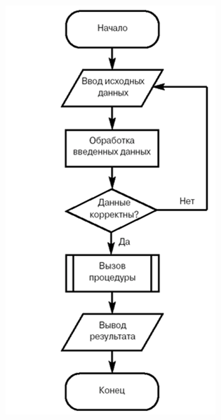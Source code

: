 \documentclass[default]{beamer}
\begin{document}
\begin{frame}
\begin{columns}
\begin{column}{0.3\textwidth}
\begin{figure}
					\includegraphics[width=\textwidth]{procedural}
				\end{figure}
			\end{column}

		\end{columns}

	\end{frame}
\end{document}
